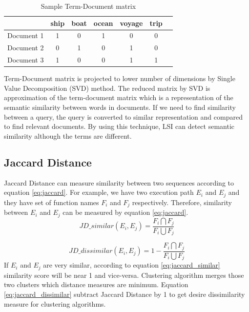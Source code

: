 \begin{table}[h]
    \centering
    \caption{Sample Term-Document matrix}
 \begin{tabular}{|c|c|c|c|c|c|c|}
    \hline
    
        & ship & boat & ocean & voyage & trip   \\
        \hline
        Document 1 & 1 & 0 & 1 & 0 & 0  \\
        Document 2 & 0 & 1 & 0 & 1 & 0    \\
        Document 3 & 1 & 0 & 0 & 1 & 1  \\
    \hline
    \end{tabular}
    
    \label{tb:LSI_term_document}
\end{table}


Term-Document matrix is projected to lower number of dimensions by Single Value Decomposition (SVD) method. The reduced matrix by SVD is approximation of the term-document matrix which is a representation of the semantic similarity between words in documents. If we need to find similarity between a query, the query is converted to similar representation and compared to find relevant documents. By using this technique, LSI can detect semantic similarity although the terms are different.   


\subsection{Jaccard Distance}
Jaccard Distance can measure similarity between two sequences according to equation \ref{eq:jaccard}. For example, we have two execution path $E_i$ and $E_j$ and they have set of function names $F_i$ and $F_j$ respectively. Therefore, similarity between $E_i$ and $E_j$ can be measured by equation \ref{eq:jaccard}. 
\begin{equation}
\label{eq:jaccard_similar}
    JD\_similar(E_i, E_j) =  \frac{F_i \bigcap F_j}{F_i \bigcup F_j}
\end{equation}

\begin{equation}
\label{eq:jaccard_dissimilar}
    JD\_dissimilar(E_i, E_j) =  1 - \frac{F_i \bigcap F_j}{F_i \bigcup F_j}
\end{equation}
If $E_i$ and $E_j$ are very similar, according to equation \ref{eq:jaccard_similar} similarity score will be near 1 and vice-versa. Clustering algorithm merges those two clusters which distance measures are minimum. Equation \ref{eq:jaccard_dissimilar} subtract Jaccard Distance by 1 to get desire dissimilarity measure for clustering algorithms.


